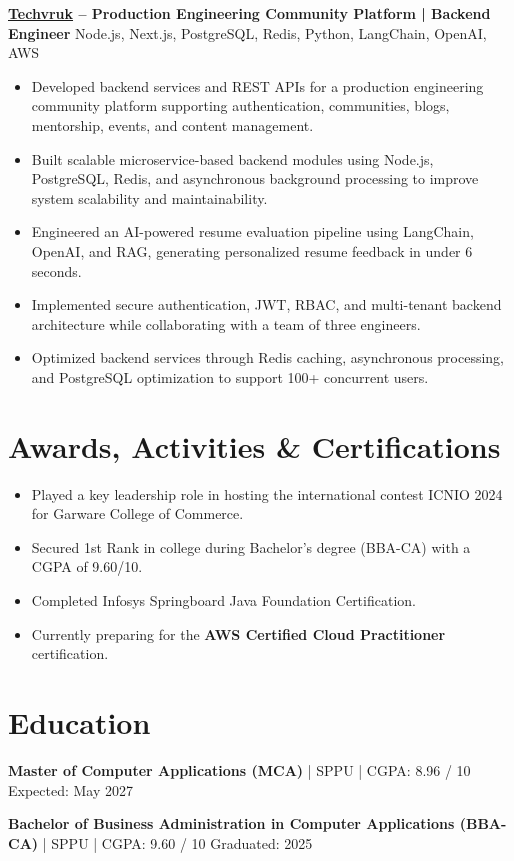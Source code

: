 \documentclass[a4paper,10pt]{article}
\begin{document}
\textbf{\href{https://techvruk.com}{Techvruk} -- Production Engineering Community Platform | Backend Engineer} \hfill Node.js, Next.js, PostgreSQL, Redis, Python, LangChain, OpenAI, AWS

\begin{itemize}[leftmargin=*]
    \item Developed backend services and REST APIs for a production engineering community platform supporting authentication, communities, blogs, mentorship, events, and content management.
    \item Built scalable microservice-based backend modules using Node.js, PostgreSQL, Redis, and asynchronous background processing to improve system scalability and maintainability.
    \item Engineered an AI-powered resume evaluation pipeline using LangChain, OpenAI, and RAG, generating personalized resume feedback in under 6 seconds.
    \item Implemented secure authentication, JWT, RBAC, and multi-tenant backend architecture while collaborating with a team of three engineers.
    \item Optimized backend services through Redis caching, asynchronous processing, and PostgreSQL optimization to support 100+ concurrent users.
\end{itemize}

\section*{Awards, Activities \& Certifications}

\begin{itemize}[leftmargin=*]
    \item Played a key leadership role in hosting the international contest ICNIO 2024 for Garware College of Commerce.
    \item Secured 1st Rank in college during Bachelor's degree (BBA-CA) with a CGPA of 9.60/10.
    \item Completed Infosys Springboard Java Foundation Certification.
    \item Currently preparing for the \textbf{AWS Certified Cloud Practitioner} certification.
\end{itemize}

\section*{Education}

\textbf{Master of Computer Applications (MCA)} | SPPU | CGPA: 8.96 / 10 \hfill Expected: May 2027

\vspace{4pt}

\textbf{Bachelor of Business Administration in Computer Applications (BBA-CA)} | SPPU | CGPA: 9.60 / 10 \hfill Graduated: 2025 
\end{document}
